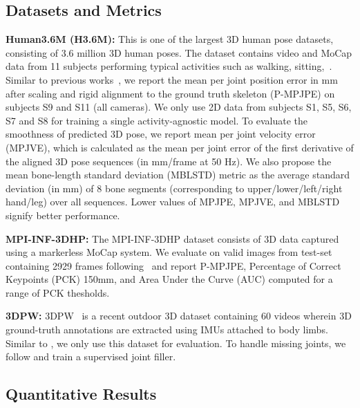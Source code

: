 \documentclass[10pt,twocolumn,letterpaper]{article}
\begin{document}
\subsection{Datasets and Metrics}

\noindent\textbf{Human3.6M (H3.6M):} This is one of the largest 3D human pose datasets, consisting of 3.6 million 3D human poses. The dataset contains video and MoCap data from 11 subjects performing typical activities such as walking, sitting,~\etc. Similar to previous works~\cite{chingCVPR2019,ZedNet_2018_ECCVW,kanazawa2018end}, we report the mean per joint position error in mm after scaling and rigid alignment to the ground truth skeleton (P-MPJPE) on subjects S9 and S11 (all cameras).
We only use 2D data from subjects S1, S5, S6, S7 and S8 for training a single activity-agnostic model. To evaluate the smoothness of predicted 3D pose, we report mean per joint velocity error (MPJVE), which is calculated as the mean per joint error of the first derivative of the aligned 3D pose sequences (in mm/frame at 50 Hz). We also propose the mean bone-length standard deviation (MBLSTD) metric as the average standard deviation (in mm) of 8 bone segments (corresponding to upper/lower/left/right hand/leg) over all sequences. Lower values of MPJPE, MPJVE, and MBLSTD signify better performance.



\noindent\textbf{MPI-INF-3DHP:}
The MPI-INF-3DHP dataset consists of 3D data captured using a markerless MoCap system. We evaluate on valid images from test-set containing 2929 frames following~\cite{kanazawa2018end} and report P-MPJPE, Percentage of Correct Keypoints (PCK) 150mm, and Area Under the Curve (AUC) computed for a range of PCK thesholds. 

\noindent\textbf{3DPW:}
3DPW~\cite{vonMarcard2018} is a recent outdoor 3D dataset containing 60 videos wherein 3D ground-truth annotations are extracted using IMUs attached to body limbs. Similar to \cite{SPIN_ICCV2019}, we only use this dataset for evaluation. To handle missing joints, we follow \cite{chingCVPR2019} and train a supervised joint filler. 





\subsection{Quantitative Results}
\end{document}
